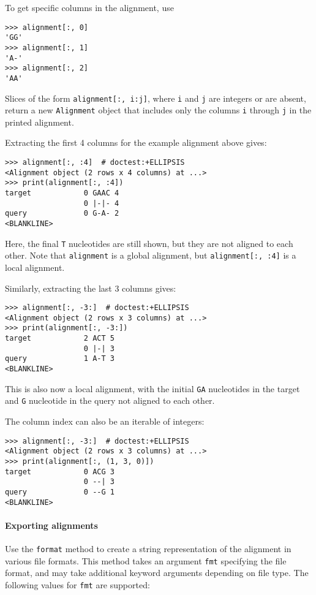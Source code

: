 To get specific columns in the alignment, use
\begin{verbatim}
>>> alignment[:, 0]
'GG'
>>> alignment[:, 1]
'A-'
>>> alignment[:, 2]
'AA'
\end{verbatim}

Slices of the form \verb+alignment[:, i:j]+, where \verb+i+ and \verb+j+ are integers or are absent, return a new \verb+Alignment+ object that includes only the columns \verb+i+ through \verb+j+ in the printed alignment.

Extracting the first 4 columns for the example alignment above gives:
\begin{verbatim}
>>> alignment[:, :4]  # doctest:+ELLIPSIS
<Alignment object (2 rows x 4 columns) at ...>
>>> print(alignment[:, :4])
target            0 GAAC 4
                  0 |-|- 4
query             0 G-A- 2
<BLANKLINE>
\end{verbatim}
Here, the final \verb+T+ nucleotides are still shown, but they are not aligned to each other. Note that \verb+alignment+ is a global alignment, but \verb+alignment[:, :4]+ is a local alignment.

Similarly, extracting the last 3 columns gives:
\begin{verbatim}
>>> alignment[:, -3:]  # doctest:+ELLIPSIS
<Alignment object (2 rows x 3 columns) at ...>
>>> print(alignment[:, -3:])
target            2 ACT 5
                  0 |-| 3
query             1 A-T 3
<BLANKLINE>
\end{verbatim}
This is also now a local alignment, with the initial \verb+GA+ nucleotides in the target and \verb+G+ nucleotide in the query not aligned to each other.

The column index can also be an iterable of integers:
\begin{verbatim}
>>> alignment[:, -3:]  # doctest:+ELLIPSIS
<Alignment object (2 rows x 3 columns) at ...>
>>> print(alignment[:, (1, 3, 0)])
target            0 ACG 3
                  0 --| 3
query             0 --G 1
<BLANKLINE>
\end{verbatim}

\paragraph*{Exporting alignments}

Use the \verb+format+ method to create a string representation of the alignment in various file formats. This method takes an argument \verb+fmt+ specifying the file format, and may take additional keyword arguments depending on file type. The following values for \verb+fmt+ are supported:

